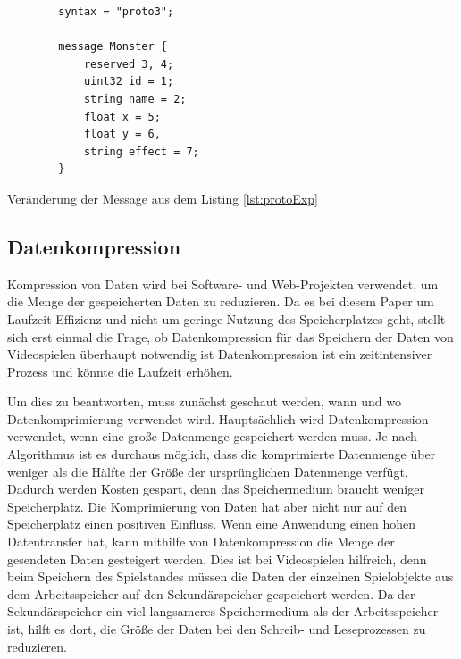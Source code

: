\begin{listing}[htp]
    \begin{verbatim} 
        syntax = "proto3";
        
        message Monster {
            reserved 3, 4; 
            uint32 id = 1;
            string name = 2;
            float x = 5;
            float y = 6,
            string effect = 7;
        }
    \end{verbatim}
    \caption{Veränderung der Message aus dem Listing \ref{lst:protoExp}}
    \label{lst:protoReserved}
\end{listing}


\subsection{Datenkompression} \label{ssec:kompression}
Kompression von Daten wird bei Software- und Web-Projekten verwendet, um die Menge der gespeicherten Daten zu reduzieren. Da es bei diesem Paper um Laufzeit-Effizienz und nicht um geringe Nutzung des Speicherplatzes geht, stellt sich erst einmal die Frage, ob Datenkompression für das Speichern der Daten von Videospielen überhaupt notwendig ist Datenkompression ist ein zeitintensiver Prozess und könnte die Laufzeit erhöhen.

Um dies zu beantworten, muss zunächst geschaut werden, wann und wo Datenkomprimierung verwendet wird. Hauptsächlich wird Datenkompression verwendet, wenn eine große Datenmenge gespeichert werden muss. Je nach Algorithmus ist es durchaus möglich, dass die komprimierte Datenmenge über weniger als die Hälfte der Größe der ursprünglichen Datenmenge verfügt. Dadurch werden Kosten gespart, denn das Speichermedium braucht weniger Speicherplatz. Die Komprimierung von Daten hat aber nicht nur auf den Speicherplatz einen positiven Einfluss. Wenn eine Anwendung einen hohen Datentransfer hat, kann mithilfe von Datenkompression die Menge der gesendeten Daten gesteigert werden. Dies ist bei Videospielen hilfreich, denn beim Speichern des Spielstandes müssen die Daten der einzelnen Spielobjekte aus dem Arbeitsspeicher auf den Sekundärspeicher gespeichert werden. Da der Sekundärspeicher ein viel langsameres Speichermedium als der Arbeitsspeicher ist, hilft es dort, die Größe der Daten bei den Schreib- und Leseprozessen zu reduzieren.\cite{mediumWhenDataCompression}

